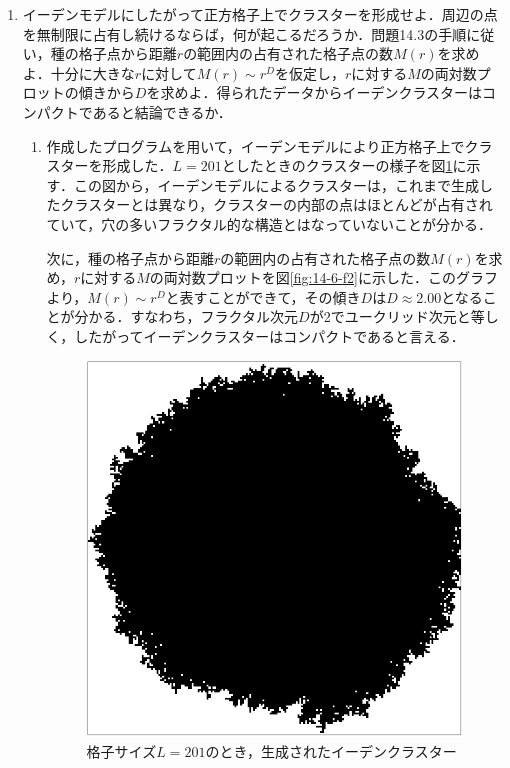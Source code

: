 \documentclass{jsarticle}
\begin{document}
    \begin{enumerate}
        \renewcommand{\labelenumi}{\alph{enumi}.}
        \renewcommand{\labelenumii}{}
        
        \item イーデンモデルにしたがって正方格子上でクラスターを形成せよ．周辺の点を無制限に占有し続けるならば，何が起こるだろうか．問題14.3の手順に従い，種の格子点から距離$r$の範囲内の占有された格子点の数$M(r)$を求めよ．十分に大きな$r$に対して$M(r)\sim r^{D}$を仮定し，$r$に対する$M$の両対数プロットの傾きから$D$を求めよ．得られたデータからイーデンクラスターはコンパクトであると結論できるか．
            
            \begin{enumerate}
                \item 作成したプログラムを用いて，イーデンモデルにより正方格子上でクラスターを形成した．$L=201$としたときのクラスターの様子を図\ref{fig:14-6-f1}に示す．この図から，イーデンモデルによるクラスターは，これまで生成したクラスターとは異なり，クラスターの内部の点はほとんどが占有されていて，穴の多いフラクタル的な構造とはなっていないことが分かる．
                
                次に，種の格子点から距離$r$の範囲内の占有された格子点の数$M(r)$を求め，$r$に対する$M$の両対数プロットを図\ref{fig:14-6-f2}に示した．このグラフより，$M(r) \sim r^{D}$と表すことができて，その傾き$D$は$D\approx2.00$となることが分かる．すなわち，フラクタル次元$D$が2でユークリッド次元と等しく，したがってイーデンクラスターはコンパクトであると言える．
                
                \begin{figure}[H]
                    \begin{center}
                        \includegraphics[width=10.0cm]{figure_1.pdf}
                        \caption{格子サイズ$L=201$のとき，生成されたイーデンクラスター}
                        \label{fig:14-6-f1}
                    \end{center}
                \end{figure}


\end{enumerate}
\end{enumerate}
\end{document}
